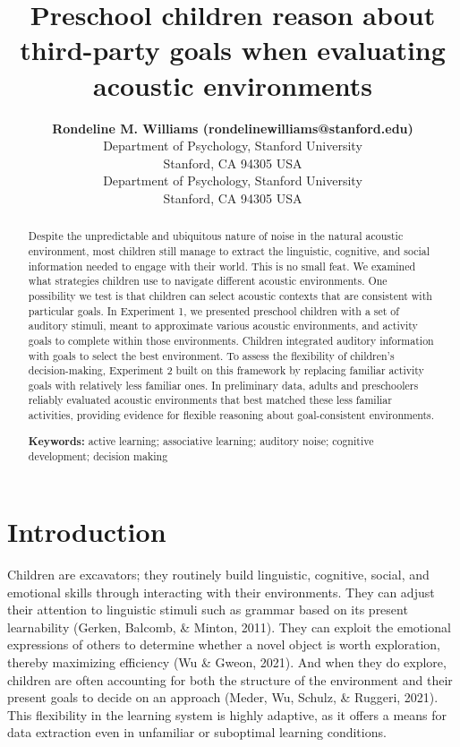 \documentclass[10pt, letterpaper]{article}
\title{Preschool children reason about third-party goals when evaluating
acoustic environments}
\author{{\large \bf Rondeline M. Williams (rondelinewilliams@stanford.edu)} \\ Department of Psychology, Stanford University \\ Stanford, CA 94305 USA \AND {\large \bf Michael C.~Frank (mcfrank@stanford.edu)} \\ Department of Psychology, Stanford University \\ Stanford, CA 94305 USA}
\begin{document}
\maketitle

\begin{abstract}
Despite the unpredictable and ubiquitous nature of noise in the natural
acoustic environment, most children still manage to extract the
linguistic, cognitive, and social information needed to engage with
their world. This is no small feat. We examined what strategies children
use to navigate different acoustic environments. One possibility we test
is that children can select acoustic contexts that are consistent with
particular goals. In Experiment 1, we presented preschool children with
a set of auditory stimuli, meant to approximate various acoustic
environments, and activity goals to complete within those environments.
Children integrated auditory information with goals to select the best
environment. To assess the flexibility of children's decision-making,
Experiment 2 built on this framework by replacing familiar activity
goals with relatively less familiar ones. In preliminary data, adults
and preschoolers reliably evaluated acoustic environments that best
matched these less familiar activities, providing evidence for flexible
reasoning about goal-consistent environments.

\textbf{Keywords:}
active learning; associative learning; auditory noise; cognitive
development; decision making
\end{abstract}

\hypertarget{introduction}{%
\section{Introduction}\label{introduction}}

Children are excavators; they routinely build linguistic, cognitive,
social, and emotional skills through interacting with their
environments. They can adjust their attention to linguistic stimuli such
as grammar based on its present learnability (Gerken, Balcomb, \&
Minton, 2011). They can exploit the emotional expressions of others to
determine whether a novel object is worth exploration, thereby
maximizing efficiency (Wu \& Gweon, 2021). And when they do explore,
children are often accounting for both the structure of the environment
and their present goals to decide on an approach (Meder, Wu, Schulz, \&
Ruggeri, 2021). This flexibility in the learning system is highly
adaptive, as it offers a means for data extraction even in unfamiliar or
suboptimal learning conditions.
\end{document}

